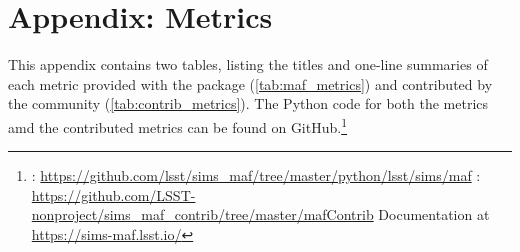 \setcounter{chapter}{0}
\chapter*{Appendix: \MAF Metrics}
\def\chpname{metrics}\label{chp:\chpname}
\markboth{}{}

This appendix contains two tables, listing the titles and one-line summaries of each metric provided with the \MAF package (\autoref{tab:maf_metrics}) and contributed by the community (\autoref{tab:contrib_metrics}). The Python code for both the \MAF metrics amd the contributed metrics can be found on GitHub.\footnote{\MAF: \url{https://github.com/lsst/sims_maf/tree/master/python/lsst/sims/maf}
\newline\noindent{}: \url{https://github.com/LSST-nonproject/sims\_maf\_contrib/tree/master/mafContrib}
\newline\noindent Documentation at \url{ https://sims-maf.lsst.io/}}




